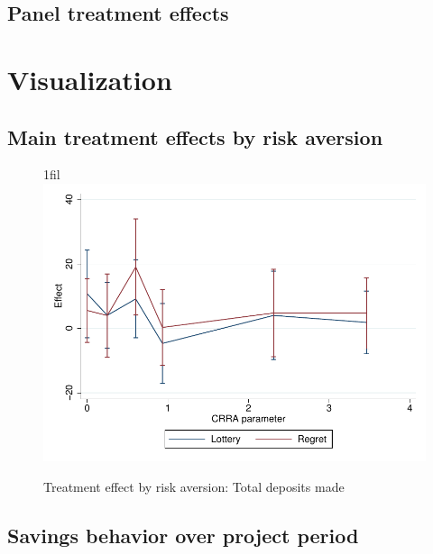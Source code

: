 \documentclass[10pt]{article}
\makeatletter
\newcommand*{\centerfloat}{%
  \parindent \z@
  \leftskip \z@ \@plus 1fil \@minus \textwidth
  \rightskip\leftskip
  \parfillskip \z@skip}
\makeatother
\begin{document}
	\clearpage

	\subsection{Panel treatment effects}

		
		

	\clearpage

\section{Visualization}

	\subsection{Main treatment effects by risk aversion}

		\begin{figure}[!htb]
		\centering
		\caption{Treatment effect by risk aversion: Total deposits made}
		\centerfloat
		\includegraphics{../../figures/line-mobile_totdepositsbyrisk.pdf}
		\end{figure}

	\clearpage

	\subsection{Savings behavior over project period}
\end{document}

